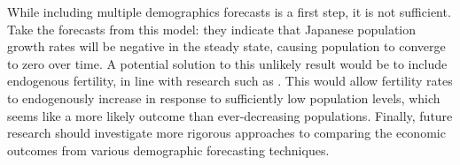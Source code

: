 \documentclass[10pt]{article}
\renewcommand{\thesection}{\arabic{section}}
\renewcommand{\section}[2][]{\oldsection[#1]{#2}\index{#1}\label{sec:\thesection}}
\numberwithin{equation}{subsection}
\begin{document}
\par While including multiple demographics forecasts is a first step, it is not sufficient. Take the forecasts from this model: they indicate that Japanese population growth rates will be negative in the steady state, causing population to converge to zero over time. A potential solution to this unlikely result would be to include endogenous fertility, in line with research such as \cite{BB1989}. This would allow fertility rates to endogenously increase in response to sufficiently low population levels, which seems like a more likely outcome than ever-decreasing populations. Finally, future research should investigate more rigorous approaches to comparing the economic outcomes from various demographic forecasting techniques.




\end{document}
